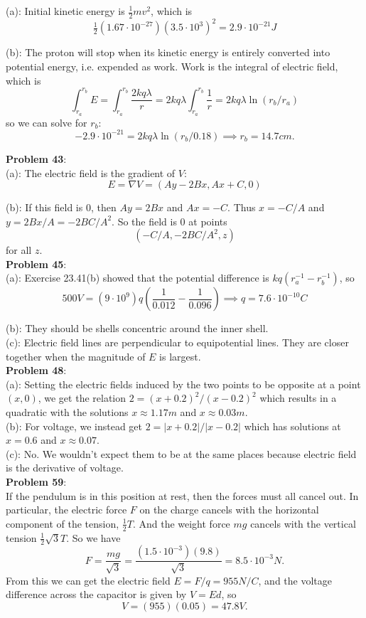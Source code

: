 \documentclass{amsart}
\begin{document}
	(a): Initial kinetic energy is $\tfrac12 mv^2$, which is
	$$
	\tfrac12 (1.67\cdot 10^{-27})(3.5\cdot 10^3)^2 = 2.9 \cdot 10^{-21} J
	$$
	
	(b): The proton will stop when its kinetic energy is entirely converted into potential energy, i.e. expended as work. Work is the integral of electric field, which is
	$$
	\int_{r_a}^{r_b} E = \int_{r_a}^{r_b} \frac{2kq\lambda}{r} = 2kq\lambda \int_{r_a}^{r_b}\frac{1}{r} = 2kq\lambda\ln(r_b/r_a)
	$$
	so we can solve for $r_b$:
	$$
	-2.9\cdot 10^{-21} = 2kq\lambda \ln(r_b/0.18) \implies r_b = 14.7 cm.
	$$
	
	\textbf{Problem 43}:\\
	
	(a): The electric field is the gradient of $V$:
	$$
	E = \nabla V = (Ay-2Bx,Ax + C,0)
	$$
	
	(b): If this field is 0, then $Ay=2Bx$ and $Ax=-C$. Thus $x=-C/A$ and $y=2Bx/A = -2BC/A^2$. So the field is 0 at points
	$$
	(-C/A,-2BC/A^2,z)
	$$
	for all $z$.\\
	
	\textbf{Problem 45}:\\
	
	(a): Exercise 23.41(b) showed that the potential difference is $kq(r_a^{-1}-r_b^{-1})$, so
	$$
	500V = (9\cdot 10^9)q(\frac{1}{0.012} - \frac{1}{0.096}) \implies q = 7.6 \cdot 10^{-10} C
	$$
	
	(b): They should be shells concentric around the inner shell.\\
	
	(c): Electric field lines are perpendicular to equipotential lines. They are closer together when the magnitude of $E$ is largest.\\
	
	\textbf{Problem 48}:\\
	
	(a): Setting the electric fields induced by the two points to be opposite at a point $(x,0)$, we get the relation $2=(x+0.2)^2/(x-0.2)^2$ which results in a quadratic with the solutions $x\approx 1.17m$ and $x\approx 0.03m$.\\
	
	(b): For voltage, we instead get $2=|x+0.2|/|x-0.2|$ which has solutions at $x=0.6$ and $x\approx 0.07$.\\
	
	(c): No. We wouldn't expect them to be at the same places because electric field is the derivative of voltage.\\
	
	\textbf{Problem 59}:\\
	
	If the pendulum is in this position at rest, then the forces must all cancel out. In particular, the electric force $F$ on the charge cancels with the horizontal component of the tension, $\tfrac12 T$. And the weight force $mg$ cancels with the vertical tension $\tfrac12 \sqrt{3}T$. So we have
	$$
	F = \frac{mg}{\sqrt{3}} = \frac{(1.5\cdot 10^{-3})(9.8)}{\sqrt{3}} = 8.5\cdot 10^{-3} N.
	$$
	From this we can get the electric field $E=F/q = 955 N/C$, and the voltage difference across the capacitor is given by $V=Ed$, so
	$$
	V = (955)(0.05) = 47.8 V.
	$$
\end{document}
